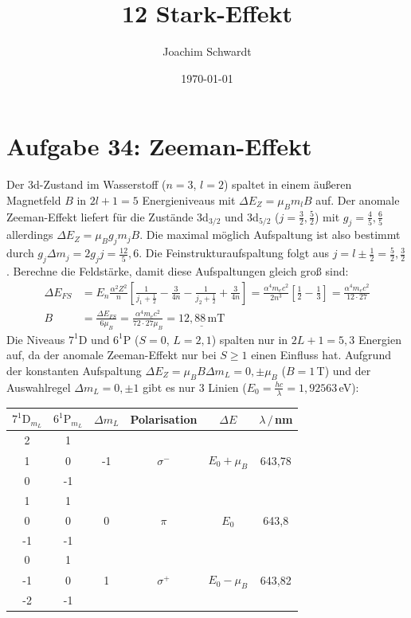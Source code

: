 \documentclass[a4paper,12pt]{article}
\newcommand{\klam}{}
\newcommand{\tecxt}{}
\begin{document}
\title{12 Stark-Effekt}
\author{Joachim Schwardt}
\date{\today}
\maketitle

\section*{Aufgabe 34: Zeeman-Effekt}
Der 3d-Zustand im Wasserstoff ($n=3$, $l=2$) spaltet in einem äußeren Magnetfeld $B$ in $2l+1=5$ Energieniveaus mit $\Delta E_Z=\mu_Bm_lB$ auf. Der anomale Zeeman-Effekt liefert für die Zustände 3d${}_{3/2}$ und 3d${}_{5/2}$ ($j=\frac{3}{2},\frac{5}{2}$) mit $g_j=\frac{4}{5},\frac{6}{5}$ allerdings $\Delta E_Z=\mu_Bg_jm_jB$. Die maximal möglich Aufspaltung ist also bestimmt durch $g_j\Delta m_j=2g_jj=\frac{12}{5},6$. Die Feinstrukturaufspaltung folgt aus $j=l\pm\frac{1}{2}=\frac{5}{2},\frac{3}{2}$. Berechne die Feldstärke, damit diese Aufspaltungen gleich groß sind:
\begin{align*}
\Delta E_{FS}&=E_n\frac{\alpha^2Z^2}{n}\klam\left[ {\frac{1}{j_1+\frac{1}{2}}-\frac{3}{4n}-\frac{1}{j_2+\frac{1}{2}}+\frac{3}{4n}} \right]=\frac{\alpha^4m_ec^2}{2n^3}\klam\left[ {\frac{1}{2}-\frac{1}{3}} \right]=\frac{\alpha^4m_ec^2}{12\cdot 27}\\
B&=\frac{\Delta E_{FS}}{6\mu_B}=\frac{\alpha^4m_ec^2}{72\cdot 27\mu_B}=\underline{12,88\,\tecxt\text{mT}}
\end{align*}
Die Niveaus $7^1$D und $6^1$P ($S=0$, $L=2,1$) spalten nur in $2L+1=5,3$ Energien auf, da der anomale Zeeman-Effekt nur bei $S\ge 1$ einen Einfluss hat. Aufgrund der konstanten Aufspaltung $\Delta E_Z=\mu_BB\Delta m_L=0,\pm\mu_B$ ($B=1\,$T) und der Auswahlregel $\Delta m_L=0,\pm 1$ gibt es nur 3 Linien ($E_0=\frac{hc}{\lambda}=1,92563\,$eV):
\begin{table}[!h]
\centering
\begin{tabular}{c|c|c|c|c|c}
$7^1\tecxt\text{D}_{m_L}$&$6^1\tecxt\text{P}_{m_L}$&$\Delta m_L$&Polarisation&$\Delta E$&$\lambda\,/\,$nm\\ \hline
2&1&&&&\\
1&0&-1&$\sigma^{-}$&$E_0+\mu_B$&643,78\\
0&-1&&&&\\ \hline
1&1&&&&\\
0&0&0&$\pi$&$E_0$&643,8\\
-1&-1&&&&\\ \hline
0&1&&&&\\
-1&0&1&$\sigma^{+}$&$E_0-\mu_B$&643,82\\
-2&-1&&&&
\end{tabular}
\end{table}
\end{document}
